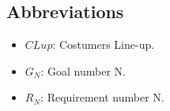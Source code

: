 \subsection{Abbreviations}

\begin{itemize}
	\item $CLup$: Costumers Line-up. 
	\item $G_N$: Goal number N.
	\item $R_N$: Requirement number N.
\end{itemize}
 
 